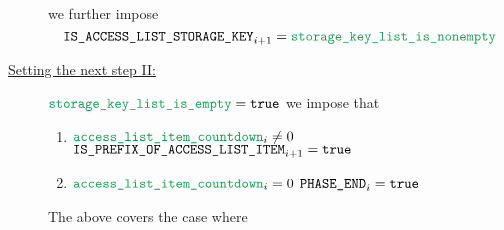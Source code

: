 \begin{description}
		we further impose
		\[
			\rlpTxnSharedColumnIsAccessListStorageKey _{i + 1} = \locStorageKeyListIsNonempty
		\]
	\item[\underline{Setting the next step II:}]
		\If $\locStorageKeyListIsEmpty = \true$ \Then
		we impose that
		\begin{enumerate}
		        \item \If $\locAddressPrewarmingCountdown _{i} \neq 0$ \Then $\texttt{IS\_PREFIX\_OF\_ACCESS\_LIST\_ITEM} _{i + 1} = \texttt{true}$
		        \item \If $\locAddressPrewarmingCountdown _{i} =    0$ \Then $\texttt{PHASE\_END} _{i} = \texttt{true}$
		\end{enumerate}
		\saNote{}
		The above covers the case where
\end{description}
